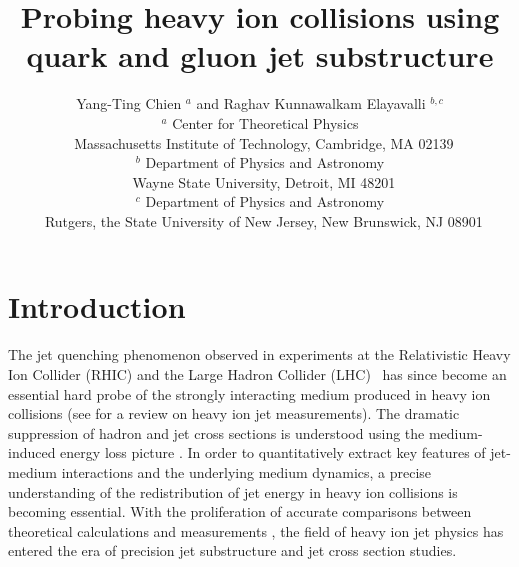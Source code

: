 \documentclass[notoc,preprintnumbers]{JHEP3}
\title{Probing heavy ion collisions using quark and gluon jet substructure}
\author{Yang-Ting Chien $^{a}$ and Raghav Kunnawalkam Elayavalli $^{b,c}$\\
$^{a}$ Center for Theoretical Physics\\
$~$ Massachusetts Institute of Technology, Cambridge, MA 02139\\
$^{b}$ Department of Physics and Astronomy\\
$~$ Wayne State University, Detroit, MI 48201\\
$^{c}$ Department of Physics and Astronomy\\
$~$ Rutgers, the State University of New Jersey, New Brunswick, NJ 08901
}
\begin{document}
\section{Introduction}
\label{sec:intro}

The jet quenching phenomenon observed in experiments at the Relativistic Heavy Ion Collider (RHIC) \cite{Adcox:2001jp,Adler:2002xw,Adcox:2004mh,Arsene:2004fa,Back:2004je,Adams:2005dq}
and the Large Hadron Collider (LHC)~\cite{Aamodt:2010jd,Aad:2010bu,Chatrchyan:2011sx,Aamodt:2011vg,CMS:2012aa,Chatrchyan:2012nia,Abelev:2012hxa,Chatrchyan:2012gt,Aad:2012vca,
Abelev:2013kqa,Aad:2013sla,Chatrchyan:2013exa,Aad:2014bxa,Khachatryan:2014bva,
Adam:2015ewa,Adam:2015doa,Aad:2015bsa,Khachatryan:2015lha,Aad:2015wga,
Khachatryan:2016odn,Khachatryan:2016xxp,Sirunyan:2016znt,Khachatryan:2016ypw,
Sirunyan:2017isk,Sirunyan:2017oug,Sirunyan:2017lzi,Sirunyan:2017jic,Sirunyan:2017xss,Sirunyan:2017qhf}
has since become an essential hard probe of the strongly interacting medium produced in heavy ion collisions (see \cite{Connors:2017ptx} for a review on heavy ion jet measurements). The dramatic suppression of hadron and jet cross sections is understood using the medium-induced energy loss picture \cite{Gyulassy:1993hr,Wang:1994fx,Zakharov:1996fv,Zakharov:1997uu,Baier:1996kr,Baier:1998kq,
Gyulassy:2000er,Gyulassy:2000fs,Wiedemann:2000za,Wang:2001ifa,
Arnold:2001ba,Arnold:2001ms,Arnold:2002ja,Casalderrey-Solana:2014bpa}. In order to quantitatively extract key features of jet-medium interactions and the underlying medium dynamics, a precise understanding of the redistribution of jet energy in heavy ion collisions is becoming essential. With the proliferation of accurate comparisons between theoretical calculations and measurements \cite{Chatrchyan:2013kwa,Khachatryan:2016tfj,Chatrchyan:2012gw,Aad:2014wha,Chatrchyan:2014ava,Aaboud:2017bzv,Sirunyan:2018qec,Khachatryan:2016erx,
Acharya:2017goa,Sirunyan:2017bsd,CMS:2017xdn}, the field of heavy ion jet physics has entered the era of precision jet substructure and jet cross section studies.
\end{document}
